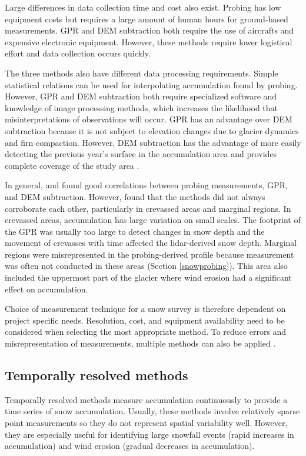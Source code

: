 \documentclass{sfuthesis}
\begin{document}
Large differences in data collection time and cost also exist. Probing has low equipment costs but requires a large amount of human hours for ground-based measurements. GPR and DEM subtraction both require the use of aircrafts and expensive electronic equipment. However, these methods require lower logistical effort and data collection occurs quickly.  

The three methods also have different data processing requirements. Simple statistical relations can be used for interpolating accumulation found by probing. However, GPR and DEM subtraction both require specialized software and knowledge of image processing methods, which increases the likelihood that misinterpretations of observations will occur. GPR has an advantage over DEM subtraction because it is not subject to elevation changes due to glacier dynamics and firn compaction. However, DEM subtraction has the advantage of more easily detecting the previous year's surface in the accumulation area and provides complete coverage of the study area \citep{Sold2013}. 

In general, \cite{Machguth2006} and \cite{Sold2013} found good correlations between probing measurements, GPR, and DEM subtraction. However, \citep{Sold2013} found that the methods did not always corroborate each other, particularly in crevassed areas and marginal regions. In crevassed areas, accumulation has large variation on small scales. The footprint of the GPR was usually too large to detect changes in snow depth and the movement of crevasses with time affected the lidar-derived snow depth. Marginal regions were misrepresented in the probing-derived profile because measurement was often not conducted in these areas (Section \ref{snowprobing}). This area also included the uppermost part of the glacier where wind erosion had a significant effect on accumulation. 

Choice of measurement technique for a snow survey is therefore dependent on project specific needs. Resolution, cost, and equipment availability need to be considered when selecting the most appropriate method. To reduce errors and misrepresentation of measurements, multiple methods can also be applied \citep{Machguth2006}. 

\subsection{Temporally resolved methods}
Temporally resolved methods measure accumulation continuously to provide a time series of snow accumulation. Usually, these methods involve relatively sparse point measurements so they do not represent spatial variability well. However, they are especially useful for identifying large snowfall events (rapid increases in accumulation) and wind erosion (gradual decreases in accumulation). 
\end{document}
